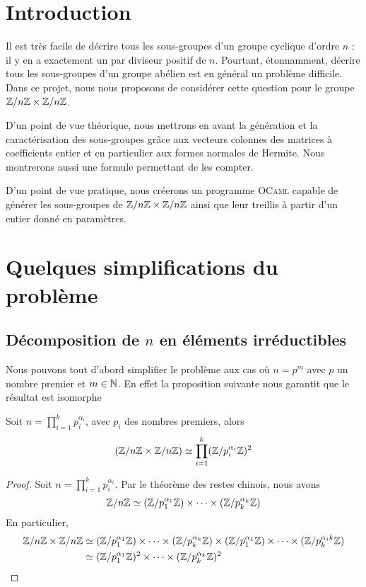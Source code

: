 \documentclass[12pt]{article}
\newcommand{\ZnZ}{\Z/n\Z}
\newcommand{\ZZ}{\ZnZ \x \ZnZ}
\begin{document}

\hfill
\thispagestyle{empty}
\newpage
\tableofcontents
\newpage
\section{Introduction}
Il est très facile de décrire tous les sous-groupes d'un groupe cyclique
d'ordre $n$ : il y en a exactement un par diviseur positif de $n$.
Pourtant, étonnamment, décrire tous les sous-groupes d'un groupe abélien
est en général un problème difficile.
Dans ce projet, nous nous proposons de considérer cette question pour le groupe $\ZZ$.

D'un point de vue théorique, nous mettrons en avant la génération et la
caractérisation des sous-groupes grâce aux vecteurs colonnes des matrices à coefficients entier et en particulier
aux formes normales de Hermite. Nous montrerons aussi une formule permettant de les compter.

D'un point de vue pratique, nous créerons un programme \textsc{OCaml} capable de générer les
sous-groupes de $\ZZ$ ainsi que leur treillis à partir d'un entier donné en paramètres.

\newpage
\section{Quelques simplifications du problème}
\subsection{Décomposition de $n$ en éléments irréductibles}\label{theoreme_chinois}

Nous pouvons tout d'abord simplifier le problème aux cas où $n = p^m$ avec $p$ un nombre premier
et $m \in \mathbb N$. En effet la proposition suivante nous garantit que le résultat est isomorphe
\begin{proposition}
	Soit $n = \prod\limits_{i = 1}^k p_i^{\alpha_i}$, avec $p_i$ des nombres premiers, alors
	$$(\ZZ) \isom \prod_{i = 1}^k(\Z/p_i^{\alpha_i}\Z)^2$$
\end{proposition}

\begin{proof}
	Soit $n = \prod\limits_{i = 1}^k p_i^{\alpha_i}$. Par le théorème des restes chinois, nous avons
	$$ \ZnZ \isom (\Z/p_1^{\alpha_1}\Z) \x \cdots \x (\Z/p_k^{\alpha_k}\Z)$$
	En particulier,
	\begin{equation*}
		\begin{split}
			\ZZ & \isom
			(\Z/p_1^{\alpha_1}\Z) \x \cdots \x (\Z/p_k^{\alpha_k}\Z) \x (\Z/p_1^{\alpha_1}\Z)%
			\x \cdots \x (\Z/p_k^{\alpha_ik}\Z)\\
			& \isom (\Z/p_1^{\alpha_1}\Z)^2 \x \cdots \x (\Z/p_k^{\alpha_k}\Z)^2
		\end{split}
	\end{equation*}
\end{proof}
\end{document}
